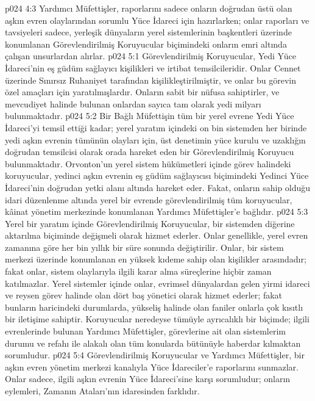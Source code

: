 \vs p024 4:3 Yardımcı Müfettişler, raporlarını sadece onların doğrudan üstü olan aşkın evren olaylarından sorumlu Yüce İdareci için hazırlarken; onlar raporları ve tavsiyeleri sadece, yerleşik dünyaların yerel sistemlerinin başkentleri üzerinde konumlanan Görevlendirilmiş Koruyucular biçimindeki onların emri altında çalışan unsurlardan alırlar.
\vs p024 5:1 Görevlendirilmiş Koruyucular, Yedi Yüce İdareci’nin eş güdüm sağlayıcı kişilikleri ve irtibat temsilcileridir. Onlar Cennet üzerinde Sınırsız Ruhaniyet tarafından kişilikleştirilmiştir, ve onlar bu görevin özel amaçları için yaratılmışlardır. Onların sabit bir nüfusa sahiptirler, ve mevcudiyet halinde bulunan onlardan sayıca tam olarak yedi milyarı bulunmaktadır.
\vs p024 5:2 Bir Bağlı Müfettişin tüm bir yerel evrene Yedi Yüce İdareci’yi temsil ettiği kadar; yerel yaratım içindeki on bin sistemden her birinde yedi aşkın evrenin tümünün olayları için, üst denetimin yüce kurulu ve uzaklığın doğrudan temsilcisi olarak orada hareket eden bir Görevlendirilmiş Koruyucu bulunmaktadır. Orvonton’un yerel sistem hükümetleri içinde görev halindeki koruyucular, yedinci aşkın evrenin eş güdüm sağlayıcısı biçimindeki Yedinci Yüce İdareci’nin doğrudan yetki alanı altında hareket eder. Fakat, onların sahip olduğu idari düzenlenme altında yerel bir evrende görevlendirilmiş tüm koruyucular, kâinat yönetim merkezinde konumlanan Yardımcı Müfettişler’e bağlıdır.
\vs p024 5:3 Yerel bir yaratım içinde Görevlendirilmiş Koruyucular, bir sistemden diğerine aktarılma biçiminde değişmeli olarak hizmet ederler. Onlar genellikle, yerel evren zamanına göre her bin yıllık bir süre sonunda değiştirilir. Onlar, bir sistem merkezi üzerinde konumlanan en yüksek kıdeme sahip olan kişilikler arasındadır; fakat onlar, sistem olaylarıyla ilgili karar alma süreçlerine hiçbir zaman katılmazlar. Yerel sistemler içinde onlar, evrimsel dünyalardan gelen yirmi idareci ve reysen görev halinde olan dört baş yönetici olarak hizmet ederler; fakat bunların haricindeki durumlarda, yükseliş halinde olan faniler onlarla çok kısıtlı bir iletişime sahiptir. Koruyucular neredeyse tümüyle ayrıcalıklı bir biçimde; ilgili evrenlerinde bulunan Yardımcı Müfettişler, görevlerine ait olan sistemlerim durumu ve refahı ile alakalı olan tüm konularda bütünüyle haberdar kılmaktan sorumludur.
\vs p024 5:4 Görevlendirilmiş Koruyucular ve Yardımcı Müfettişler, bir aşkın evren yönetim merkezi kanalıyla Yüce İdareciler’e raporlarını sunmazlar. Onlar sadece, ilgili aşkın evrenin Yüce İdareci’sine karşı sorumludur; onların eylemleri, Zamanın Ataları’nın idaresinden farklıdır.

